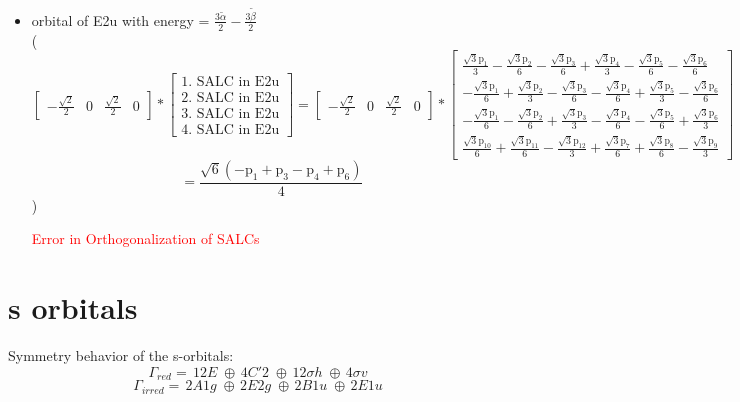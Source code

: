 \documentclass[12pt,a4paper]{article}
\begin{document}
\begin{itemize}
\textcolor{red}{Error in Orthogonalization of SALCs}\item orbital of E2u with energy = 
                                $\frac{3 \tilde{\alpha}}{2} - \frac{3 \tilde{\beta}}{2}$ \\
( 
$$
\left[\begin{matrix}- \frac{\sqrt{2}}{2} & 0 & \frac{\sqrt{2}}{2} & 0\end{matrix}\right] * \left[\begin{array}{c}\text{1. SALC in E2u} \\ \text{2. SALC in E2u} \\ \text{3. SALC in E2u} \\ \text{4. SALC in E2u}\end{array}\right] = \left[\begin{matrix}- \frac{\sqrt{2}}{2} & 0 & \frac{\sqrt{2}}{2} & 0\end{matrix}\right] * \left[\begin{matrix}\frac{\sqrt{3} \text{p}_{1}}{3} - \frac{\sqrt{3} \text{p}_{2}}{6} - \frac{\sqrt{3} \text{p}_{3}}{6} + \frac{\sqrt{3} \text{p}_{4}}{3} - \frac{\sqrt{3} \text{p}_{5}}{6} - \frac{\sqrt{3} \text{p}_{6}}{6}\\- \frac{\sqrt{3} \text{p}_{1}}{6} + \frac{\sqrt{3} \text{p}_{2}}{3} - \frac{\sqrt{3} \text{p}_{3}}{6} - \frac{\sqrt{3} \text{p}_{4}}{6} + \frac{\sqrt{3} \text{p}_{5}}{3} - \frac{\sqrt{3} \text{p}_{6}}{6}\\- \frac{\sqrt{3} \text{p}_{1}}{6} - \frac{\sqrt{3} \text{p}_{2}}{6} + \frac{\sqrt{3} \text{p}_{3}}{3} - \frac{\sqrt{3} \text{p}_{4}}{6} - \frac{\sqrt{3} \text{p}_{5}}{6} + \frac{\sqrt{3} \text{p}_{6}}{3}\\\frac{\sqrt{3} \text{p}_{10}}{6} + \frac{\sqrt{3} \text{p}_{11}}{6} - \frac{\sqrt{3} \text{p}_{12}}{3} + \frac{\sqrt{3} \text{p}_{7}}{6} + \frac{\sqrt{3} \text{p}_{8}}{6} - \frac{\sqrt{3} \text{p}_{9}}{3}\end{matrix}\right] 
 $$ $$ = \frac{\sqrt{6} \left(- \text{p}_{1} + \text{p}_{3} - \text{p}_{4} + \text{p}_{6}\right)}{4} 
 $$ 
 )

\textcolor{red}{Error in Orthogonalization of SALCs}\end{itemize}



\newpage \section*{s orbitals}
Symmetry behavior of the s-orbitals:
$$\mathsf{\Gamma}_{red} = \,12 E\;\oplus{}\,4 C'2\;\oplus{}\,12 \sigma h\;\oplus{}\,4 \sigma v\;$$
$$\mathsf{\Gamma}_{irred} = \,2 A1g\;\oplus{}\,2 E2g\;\oplus{}\,2 B1u\;\oplus{}\,2 E1u\;$$
\end{document}
